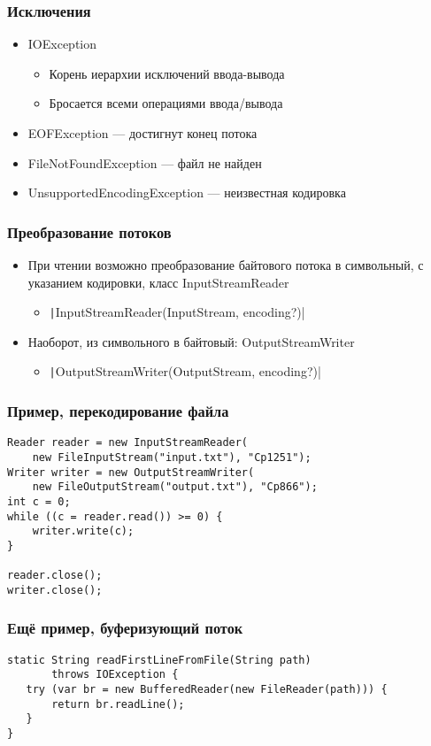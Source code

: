 \documentclass[xetex,mathserif,serif]{beamer}
\begin{document}
	\begin{frame}
		\frametitle{Исключения}
		\begin{itemize}
			\item IOException 
			\begin{itemize}
				\item Корень иерархии исключений ввода-вывода
				\item Бросается всеми операциями ввода/вывода
			\end{itemize}
			\item EOFException --- достигнут конец потока
			\item FileNotFoundException --- файл не найден
			\item UnsupportedEncodingException --- неизвестная кодировка
		\end{itemize}
	\end{frame}

	\begin{frame}
		\frametitle{Преобразование потоков}
		\begin{itemize}
			\item При чтении возможно преобразование байтового потока в символьный, с указанием кодировки, класс InputStreamReader
			\begin{itemize}
				\item \texttt|InputStreamReader(InputStream, encoding?)|
			\end{itemize}
			\item Наоборот, из символьного в байтовый: OutputStreamWriter
			\begin{itemize}
				\item \texttt|OutputStreamWriter(OutputStream, encoding?)|
			\end{itemize}
		\end{itemize}
	\end{frame}

	\begin{frame}[fragile]
		\frametitle{Пример, перекодирование файла}
		\begin{verbatim}
Reader reader = new InputStreamReader(
    new FileInputStream("input.txt"), "Cp1251");
Writer writer = new OutputStreamWriter(
    new FileOutputStream("output.txt"), "Cp866");
int c = 0;
while ((c = reader.read()) >= 0) {
    writer.write(c);
}

reader.close();
writer.close();
		\end{verbatim}
	\end{frame}

	\begin{frame}[fragile]
		\frametitle{Ещё пример, буферизующий поток}
		\begin{verbatim}
static String readFirstLineFromFile(String path)
       throws IOException {
   try (var br = new BufferedReader(new FileReader(path))) {
       return br.readLine();
   }
}
		\end{verbatim}
	\end{frame}
\end{document}

